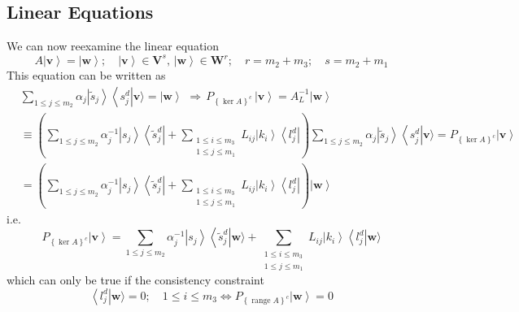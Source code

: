\documentclass[aps,preprint]{revtex4}%
\begin{document}
\subsection{Linear Equations}

We can now reexamine the linear equation
\begin{equation}
A\left|  \mathbf{v}\right\rangle =\left|  \mathbf{w}\right\rangle
\mathbf{;\quad\left|  v\right\rangle \in V}^{s},\,\left|  \mathbf{w}%
\right\rangle \mathbf{\in W}^{r};\quad r=m_{2}+m_{3};\quad s=m_{2}%
+m_{1}\label{lineq}%
\end{equation}
This equation can be written as%
\begin{align}
& \sum_{1\leq j\leq m_{2}}\alpha_{j}\left|  \tilde{s}_{j}\right\rangle
\left\langle s_{j}^{d}\right|  \mathbf{v}\rangle=\left|  \mathbf{w}%
\right\rangle \,\,\mathbf{\Rightarrow\,}P_{\left\{  \ker A\right\}  ^{c}%
}\mathbf{\,}\left|  \mathbf{v}\right\rangle =A_{L}^{-1}\left|  \mathbf{w}%
\right\rangle \nonumber\\
& \equiv\left(  \sum_{1\leq j\leq m_{2}}\alpha_{j}^{-1}\left|  s_{j}%
\right\rangle \left\langle \tilde{s}_{j}^{d}\right|  +\sum_{\substack{1\leq
i\leq m_{3} \\1\leq j\leq m_{1} }}L_{ij}\left|  k_{i}\right\rangle
\left\langle l_{j}^{d}\right|  \right)  \sum_{1\leq j\leq m_{2}}\alpha
_{j}\left|  \tilde{s}_{j}\right\rangle \left\langle s_{j}^{d}\right|
\mathbf{v}\rangle=P_{\left\{  \ker A\right\}  ^{c}}\left|  \mathbf{v}%
\right\rangle \nonumber\\
& \mathbf{=}\left(  \sum_{1\leq j\leq m_{2}}\alpha_{j}^{-1}\left|
s_{j}\right\rangle \left\langle \tilde{s}_{j}^{d}\right|  +\sum
_{\substack{1\leq i\leq m_{3} \\1\leq j\leq m_{1} }}L_{ij}\left|
k_{i}\right\rangle \left\langle l_{j}^{d}\right|  \right)  \left|
\mathbf{w}\right\rangle
\end{align}
i.e.
\begin{equation}
P_{\left\{  \ker A\right\}  ^{c}}\left|  \mathbf{v}\right\rangle =\sum_{1\leq
j\leq m_{2}}\alpha_{j}^{-1}\left|  s_{j}\right\rangle \left\langle \tilde
{s}_{j}^{d}\right|  \mathbf{w\rangle+}\sum_{\substack{1\leq i\leq m_{3}
\\1\leq j\leq m_{1} }}L_{ij}\left|  k_{i}\right\rangle \left\langle l_{j}%
^{d}\right|  \mathbf{w\rangle}%
\end{equation}
which can only be true if the consistency constraint
\begin{equation}
\left\langle l_{j}^{d}\right|  \mathbf{w}\rangle=0;\quad1\leq i\leq
m_{3}\Longleftrightarrow P_{\left\{  \operatorname{range}A\right\}  ^{c}%
}\left|  \mathbf{w}\right\rangle =0
\end{equation}
\end{document}
